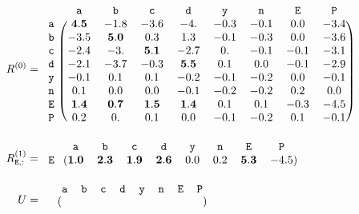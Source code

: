 \documentclass{article}
\newcommand{\ta}{\mathtt{a}}
\newcommand{\tb}{\mathtt{b}}
\newcommand{\tc}{\mathtt{c}}
\newcommand{\td}{\mathtt{d}}
\newcommand{\tn}{\mathtt{n}}
\newcommand{\ty}{\mathtt{y}}
\newcommand{\tE}{\mathtt{E}}
\newcommand{\tP}{\mathtt{P}}
\begin{document}
\begin{displaymath}
  \begin{aligned}
  R^{(0)} &=
  \begin{blockarray}{ccccccccc}
       & \ta & \tb & \tc & \td & \ty & \tn & \tE & \tP  \\
      \begin{block}{r(cccccccc)}
        \ta &  \mathbf{4.5} & -1.8 & -3.6 & -4.  & -0.3 & -0.1 & 0.0  & -3.4 \\
        \tb & -3.5 &  \mathbf{5.0}  &  0.3 &  1.3 & -0.1 & -0.3 & 0.0  & -3.6 \\
        \tc & -2.4 & -3.  &  \mathbf{5.1} & -2.7 &  0.  & -0.1 & -0.1 & -3.1 \\
        \td & -2.1 & -3.7 & -0.3 &  \mathbf{5.5} &  0.1 & 0.0  & -0.1 & -2.9 \\
        \ty & -0.1 &  0.1 &  0.1 & -0.2 & -0.1 & -0.2 &  0.0  & -0.1 \\
        \tn &  0.1 &  0.0  & 0.0  & -0.1 & -0.2 & -0.2 &  0.2 & 0.0  \\
        \tE &  \mathbf{1.4} &  \mathbf{0.7} &  \mathbf{1.5} &  \mathbf{1.4} &  0.1 &  0.1 & -0.3 & -4.5 \\
        \tP &  0.2 &  0.  &  0.1 & 0.0  & -0.1 & -0.2 &  0.1 & -0.1 \\
      \end{block}
    \end{blockarray} \\
  R^{(1)}_{\tE,:} &=
  \begin{blockarray}{ccccccccc}
       & \ta & \tb & \tc & \td & \ty & \tn & \tE & \tP  \\
      \begin{block}{r(cccccccc)}
        \tE & \mathbf{1.0}  &  \mathbf{2.3} &  \mathbf{1.9} &  \mathbf{2.6} & 0.0  &  0.2 &  \mathbf{5.3} & -4.5 \\
      \end{block}
    \end{blockarray} \\
    U &=
  \begin{blockarray}{ccccccccc}
       & \ta & \tb & \tc & \td & \ty & \tn & \tE & \tP  \\
      \begin{block}{r(cccccccc)}

\end{block}
\end{blockarray}
\end{aligned}
\end{displaymath}
\end{document}
